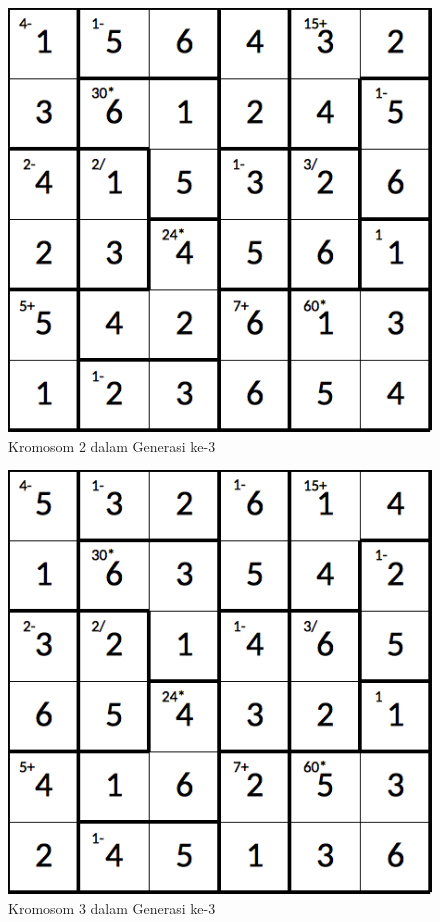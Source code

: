 \begin{figure}
\centering
\captionsetup{justification=centering}
\includegraphics[scale=0.333]{Gambar/hybridgenetic/Generation3Chromosome2}
\caption[Kromosom 2 dalam Generasi ke-3]{Kromosom 2 dalam Generasi ke-3}
\label{fig:analisisg3k2}
\end{figure}

\begin{figure}
\centering
\captionsetup{justification=centering}
\includegraphics[scale=0.333]{Gambar/hybridgenetic/Generation3Chromosome3}
\caption[Kromosom 3 dalam Generasi ke-3]{Kromosom 3 dalam Generasi ke-3}
\label{fig:analisisg3k3}
\end{figure}

